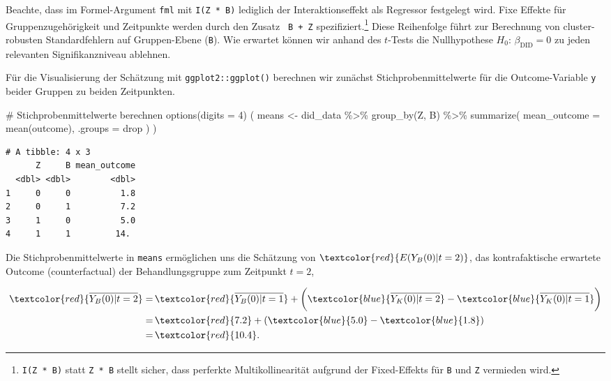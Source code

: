 \documentclass[
  a4paper,
  DIV=11,
  oneside]{scrreprt}
\newenvironment{Shaded}{\begin{snugshade}}{\end{snugshade}}
\newcommand{\AttributeTok}[1]{\textcolor[rgb]{0.40,0.45,0.13}{#1}}
\newcommand{\CommentTok}[1]{\textcolor[rgb]{0.37,0.37,0.37}{#1}}
\newcommand{\DecValTok}[1]{\textcolor[rgb]{0.68,0.00,0.00}{#1}}
\newcommand{\FunctionTok}[1]{\textcolor[rgb]{0.28,0.35,0.67}{#1}}
\newcommand{\NormalTok}[1]{\textcolor[rgb]{0.00,0.23,0.31}{#1}}
\newcommand{\OtherTok}[1]{\textcolor[rgb]{0.00,0.23,0.31}{#1}}
\newcommand{\SpecialCharTok}[1]{\textcolor[rgb]{0.37,0.37,0.37}{#1}}
\newcommand{\StringTok}[1]{\textcolor[rgb]{0.13,0.47,0.30}{#1}}
\begin{document}
Beachte, dass im Formel-Argument \texttt{fml} mit \texttt{I(Z\ *\ B)}
lediglich der Interaktionseffekt als Regressor festgelegt wird. Fixe
Effekte für Gruppenzugehörigkeit und Zeitpunkte werden durch den Zusatz
\texttt{\textbar{}\ B\ +\ Z} spezifiziert.\footnote{\texttt{I(Z\ *\ B)}
  statt \texttt{Z\ *\ B} stellt sicher, dass perferkte
  Multikollinearität aufgrund der Fixed-Effekts für \texttt{B} und
  \texttt{Z} vermieden wird.} Diese Reihenfolge führt zur Berechnung von
cluster-robusten Standardfehlern auf Gruppen-Ebene (\texttt{B}). Wie
erwartet können wir anhand des \(t\)-Tests die Nullhypothese
\(H_0:\,\beta_\text{DID} = 0\) zu jeden relevanten Signifikanzniveau
ablehnen.

Für die Visualisierung der Schätzung mit \texttt{ggplot2::ggplot()}
berechnen wir zunächst Stichprobenmittelwerte für die Outcome-Variable
\texttt{y} beider Gruppen zu beiden Zeitpunkten.

\begin{Shaded}
\begin{Highlighting}[]
\CommentTok{\# Stichprobenmittelwerte berechnen}
\FunctionTok{options}\NormalTok{(}\AttributeTok{digits =} \DecValTok{4}\NormalTok{)}
\NormalTok{(}
\NormalTok{  means }\OtherTok{\textless{}{-}}\NormalTok{ did\_data }\SpecialCharTok{\%\textgreater{}\%}
  \FunctionTok{group\_by}\NormalTok{(Z, B) }\SpecialCharTok{\%\textgreater{}\%}
  \FunctionTok{summarize}\NormalTok{(}
    \AttributeTok{mean\_outcome =} \FunctionTok{mean}\NormalTok{(outcome), }
   \AttributeTok{.groups =} \StringTok{\textquotesingle{}drop\textquotesingle{}}
\NormalTok{  )}
\NormalTok{)}
\end{Highlighting}
\end{Shaded}

\begin{verbatim}
# A tibble: 4 x 3
      Z     B mean_outcome
  <dbl> <dbl>        <dbl>
1     0     0          1.8
2     0     1          7.2
3     1     0          5.0
4     1     1         14. 
\end{verbatim}

Die Stichprobenmittelwerte in \texttt{means} ermöglichen uns die
Schätzung von \(\textcolor{red}{E(Y_B(0)|t=2)}\), das kontrafaktische
erwartete Outcome (counterfactual) der Behandlungsgruppe zum Zeitpunkt
\(t=2\),

\begin{align*}
  \textcolor{red}{\overline{Y_B(0)|t=2}} =&\, \textcolor{red}{\overline{Y_B(0)|t=1}}
  + \bigg( \textcolor{blue}{\overline{Y_K(0)|t=2}} - \textcolor{blue}{\overline{Y_K(0)|t=1}} \bigg)\\
  =&\, \textcolor{red}{7.2} + (\textcolor{blue}{5.0} - \textcolor{blue}{1.8}) \\
  =&\, \textcolor{red}{10.4}.
\end{align*}
\end{document}
